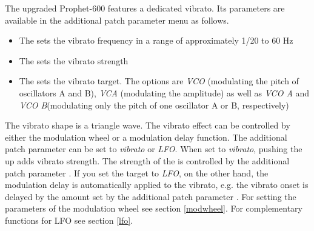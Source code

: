 The upgraded Prophet-600 features a dedicated vibrato. Its parameters are available in the additional patch parameter menu as follows.

\begin{itemize}
  \item The \vibspeed sets the vibrato frequency in a range of approximately 1/20 to 60 Hz
  \item The \vibamt sets the vibrato strength
  \item The \vibtgt sets the vibrato target. The options are \textit{VCO} (modulating the pitch of oscillators A  and B), \textit{VCA} (modulating the amplitude) as well as \textit{VCO A} and \textit{VCO B}(modulating only the pitch of one oscillator A  or  B, respectively)
\end{itemize}

The vibrato shape is a triangle wave. The vibrato effect can be controlled by either the modulation wheel or a modulation delay function. The additional patch parameter \modwheeltarget can be set to \textit{vibrato} or \textit{LFO}. When set to \textit{vibrato}, pushing the \modwheel up adds vibrato strength. The strength of the \modwheel is controlled by the additional patch parameter \modwheelrange. If you set the \modwheel target to \textit{LFO}, on the other hand, the modulation delay is automatically applied to the vibrato, e.g. the vibrato onset is delayed by the amount set by the additional patch parameter \moddelay. For setting the parameters of the modulation wheel see section \ref{modwheel}. For complementary functions for LFO see section \ref{lfo}.
